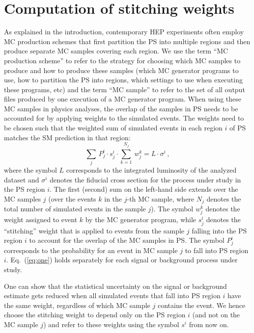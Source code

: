 \section{Computation of stitching weights}
\label{sec:stitching_weights}

As explained in the introduction,
contemporary HEP experiments often employ MC production schemes
that first partition the PS into multiple regions and then produce separate MC samples covering each region.
We use the term ``MC production scheme'' to refer to the strategy for choosing which MC samples to produce and how to produce these samples 
(which MC generator programs to use, how to partition the PS into regions, which settings to use when executing these programs, etc)
and the term ``MC sample'' to refer to the set of all output files produced by one execution of a MC generator program.
When using these MC samples in physics analyses,
the overlap of the samples in PS needs to be accounted for by applying weights to the simulated events.
The weights need to be chosen such that the weighted sum of simulated events in each region $i$ of PS 
matches the SM prediction in that region:
\begin{equation}
\sum_{j} \, P_{j}^{i} \cdot s_{j}^{i} \cdot \sum_{k=1}^{N_{j}} \, w_{j}^{k} = L \cdot \sigma^{i} \, ,
\label{eq:one}
\end{equation}
where the symbol $L$ corresponds to the integrated luminosity of the analyzed dataset
and $\sigma^{i}$ denotes the fiducial cross section for the process under study in the PS region $i$.
The first (second) sum on the left-hand side extends over the MC samples $j$ 
(over the events $k$ in the $j$-th MC sample, where $N_{j}$ denotes the total number of simulated events in the sample $j$).
The symbol $w_{j}^{k}$ denotes the weight assigned to event $k$ by the MC generator program,
while $s_{j}^{i}$ denotes the ``stitching'' weight that is applied to events from the sample $j$ falling into the PS region $i$ to account for the overlap of the MC samples in PS.
The symbol $P_{j}^{i}$ corresponds to the probability for an event in MC sample $j$ to fall into PS region $i$.
Eq.~(\ref{eq:one}) holds separately for each signal or background process under study.

One can show that the statistical uncertainty on the signal or background estimate
gets reduced when all simulated events that fall into PS region $i$ have the same weight,
regardless of which MC sample $j$ contains the event.
We hence choose the stitching weight to depend only on the PS region $i$ (and not on the MC sample $j$)
and refer to these weights using the symbol $s^{i}$ from now on.

